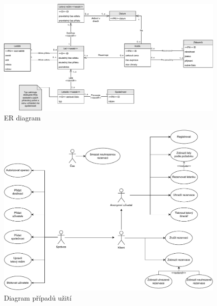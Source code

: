 \documentclass[11pt,a4paper,landscape]{article}
\begin{document}
\begin{figure}[H]
    \begin{center}
        \includegraphics[scale=0.85]{diagrams/er-diagram.pdf}
        \caption{ER diagram}
        \label{fig:1}
    \end{center}
\end{figure}
\begin{figure}[H]
    \begin{center}
        \includegraphics[scale=0.85]{diagrams/usecase-diagram.pdf}
        \caption{Diagram případů užití}
        \label{fig:2}
    \end{center}
\end{figure}

\let\clearpage\relax
\end{document}

